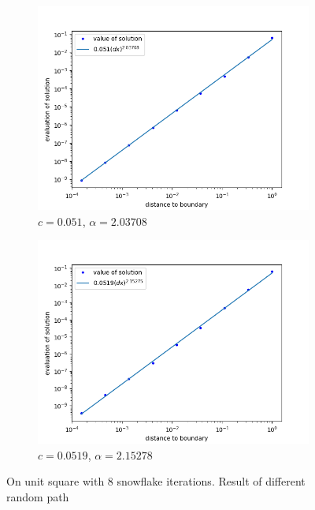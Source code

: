 \documentclass[12pt]{article}%
\theoremstyle{plain}
\numberwithin{equation}{section}
\begin{document}
  \begin{figure}[H]%
    \centering
         \begin{subfigure}[h]{0.45\linewidth}
         \caption{$c=0.051$, $\alpha=2.03708$}
\includegraphics[width=\linewidth]{figures/Ex3/evaluate_8_trial_1.png}
\end{subfigure}
 \begin{subfigure}[h]{0.45\linewidth}
         \caption{$c=0.0519$, $\alpha=2.15278$}
\includegraphics[width=\linewidth]{figures/Ex3/evaluate_8_trial_2.png}
\end{subfigure}
  \caption{On unit square with $8$ snowflake iterations.  Result of different random path }
  \label{Ex3_evaluation}
 \end{figure}
 
 
 

   


\end{document}
